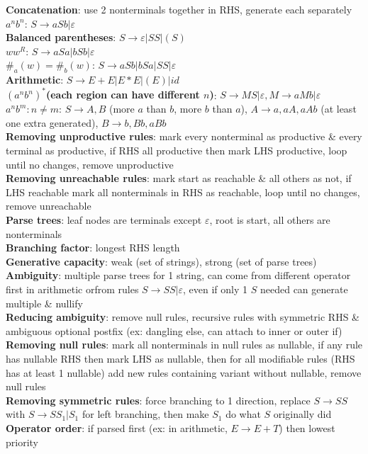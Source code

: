 \documentclass[a4paper]{article}
\begin{document}
\begin{multicols}{2}
        \textbf{Concatenation}: use 2 nonterminals together in RHS, generate each separately\\
        \boldmath$a^n b^n$\unboldmath: $S \to aSb | \varepsilon$\\
        \textbf{Balanced parentheses}: $S \to \varepsilon | SS | (S)$\\
        \boldmath$w w^R$\unboldmath: $S \to aSa | bSb | \varepsilon$\\
        \boldmath$\#_a (w) = \#_b (w)$\unboldmath: $S \to aSb | bSa | SS | \varepsilon$\\
        \textbf{Arithmetic}: $S \to E + E | E * E | (E) | id$\\
        \boldmath${(a^n b^n)}^*$\textbf{(each region can have different $n$)}\unboldmath: $S \to MS | \varepsilon, M \to aMb | \varepsilon$\\
        \boldmath$a^n b^m: n \neq m$\unboldmath: $S \to A,B$ (more $a$ than $b$, more $b$ than $a$), $A \to a, aA, aAb$ (at least one extra generated), $B \to b, Bb, aBb$\\
        \textbf{Removing unproductive rules}: mark every nonterminal as productive \& every terminal as productive, if RHS all productive then mark LHS productive, loop until no changes, remove unproductive\\
        \textbf{Removing unreachable rules}: mark start as reachable \& all others as not, if LHS reachable mark all nonterminals in RHS as reachable, loop until no changes, remove unreachable\\
        \textbf{Parse trees}: leaf nodes are terminals except $\varepsilon$, root is start, all others are nonterminals\\
        \textbf{Branching factor}: longest RHS length\\
        \textbf{Generative capacity}: weak (set of strings), strong (set of parse trees)\\
        \textbf{Ambiguity}: multiple parse trees for 1 string, can come from different operator first in arithmetic orfrom rules $S \to SS | \varepsilon$, even if only 1 $S$ needed can generate multiple \& nullify\\
        \textbf{Reducing ambiguity}: remove null rules, recursive rules with symmetric RHS \& ambiguous optional postfix (ex: dangling else, can attach to inner or outer if)\\
        \textbf{Removing null rules}: mark all nonterminals in null rules as nullable, if any rule has nullable RHS then mark LHS as nullable, then for all modifiable rules (RHS has at least 1 nullable) add new rules containing variant without nullable, remove null rules\\
        \textbf{Removing symmetric rules}: force branching to 1 direction, replace $S \to SS$ with $S \to SS_1 | S_1$ for left branching, then make $S_1$ do what $S$ originally did\\
        \textbf{Operator order}: if parsed first (ex: in arithmetic, $E \to E + T$) then lowest priority\\
    \end{multicols}
    
\end{document}
